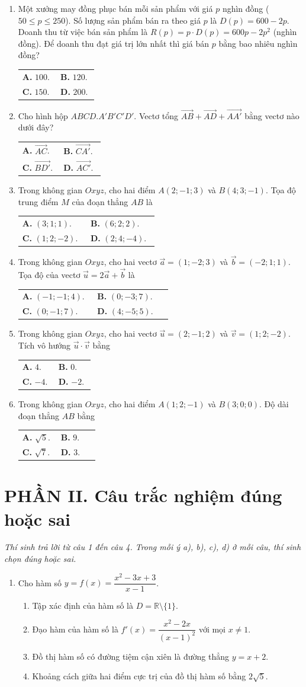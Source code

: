 \documentclass[12pt,a4paper]{article}
\makeatletter
\newcommand{\bonpa}[4]{\par\nobreak\smallskip\nobreak\noindent
\begin{tabular}{@{}p{0.47\linewidth}p{0.47\linewidth}@{}}
\textbf{A.} #1 & \textbf{B.} #2\\[8pt]
\textbf{C.} #3 & \textbf{D.} #4\end{tabular}}
\makeatother
\begin{document}
\newpage
\begin{enumerate}[start=7]
\item Một xưởng may đồng phục bán mỗi sản phẩm với giá $p$ nghìn đồng ($50\le p\le 250$). Số lượng sản phẩm bán ra theo giá $p$ là $D(p)=600-2p$. Doanh thu từ việc bán sản phẩm là $R(p)=p\cdot D(p)=600p-2p^2$ (nghìn đồng). Để doanh thu đạt giá trị lớn nhất thì giá bán $p$ bằng bao nhiêu nghìn đồng?
\bonpa{$100$.}{$120$.}{$150$.}{$200$.}

\item Cho hình hộp $ABCD.A'B'C'D'$. Vectơ tổng $\vec{AB}+\vec{AD}+\vec{AA'}$ bằng vectơ nào dưới đây?
\bonpa{$\vec{AC}$.}{$\vec{CA'}$.}{$\vec{BD'}$.}{$\vec{AC'}$.}

\item Trong không gian $Oxyz$, cho hai điểm $A(2;-1;3)$ và $B(4;3;-1)$. Tọa độ trung điểm $M$ của đoạn thẳng $AB$ là
\bonpa{$(3;1;1)$.}{$(6;2;2)$.}{$(1;2;-2)$.}{$(2;4;-4)$.}

\item Trong không gian $Oxyz$, cho hai vectơ $\vec{a}=(1;-2;3)$ và $\vec{b}=(-2;1;1)$. Tọa độ của vectơ $\vec{u}=2\vec{a}+\vec{b}$ là
\bonpa{$(-1;-1;4)$.}{$(0;-3;7)$.}{$(0;-1;7)$.}{$(4;-5;5)$.}

\item Trong không gian $Oxyz$, cho hai vectơ $\vec{u}=(2;-1;2)$ và $\vec{v}=(1;2;-2)$. Tích vô hướng $\vec{u}\cdot\vec{v}$ bằng
\bonpa{$4$.}{$0$.}{$-4$.}{$-2$.}

\item Trong không gian $Oxyz$, cho hai điểm $A(1;2;-1)$ và $B(3;0;0)$. Độ dài đoạn thẳng $AB$ bằng
\bonpa{$\sqrt{5}$.}{$9$.}{$\sqrt{7}$.}{$3$.}
\end{enumerate}

\vspace{3pt}
\section*{\large PHẦN II. Câu trắc nghiệm đúng hoặc sai}
\textit{Thí sinh trả lời từ câu 1 đến câu 4. Trong mỗi ý a), b), c), d) ở mỗi câu, thí sinh chọn đúng hoặc sai.}
\begin{enumerate}
\item Cho hàm số $y=f(x)=\dfrac{x^2-3x+3}{x-1}$.
\begin{enumerate}
\item Tập xác định của hàm số là $D=\mathbb{R}\setminus\{1\}$.
\item Đạo hàm của hàm số là $f'(x)=\dfrac{x^2-2x}{(x-1)^2}$ với mọi $x\ne 1$.
\item Đồ thị hàm số có đường tiệm cận xiên là đường thẳng $y=x+2$.
\item Khoảng cách giữa hai điểm cực trị của đồ thị hàm số bằng $2\sqrt{5}$.
\end{enumerate}
\end{enumerate}
\end{document}
